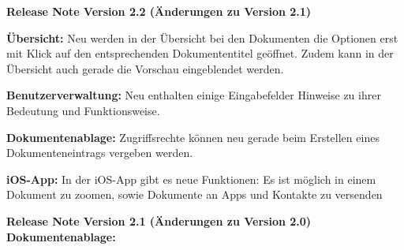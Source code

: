 \vspace{\baselineskip}

\textbf{Release Note Version 2.2 (Änderungen zu Version 2.1)} \\

\begin{compactitem}
	\item \textbf{Übersicht:} Neu werden in der Übersicht bei den Dokumenten die Optionen erst mit Klick auf den entsprechenden Dokumententitel geöffnet. Zudem kann in der Übersicht auch gerade die Vorschau eingeblendet werden. 
	\item \textbf{Benutzerverwaltung:} Neu enthalten einige Eingabefelder Hinweise zu ihrer Bedeutung und Funktionsweise.
	\item \textbf{Dokumentenablage:} Zugriffsrechte können neu gerade beim Erstellen eines Dokumenteneintrags vergeben werden.
	\item \textbf{iOS-App:} In der iOS-App gibt es neue Funktionen: Es ist möglich in einem Dokument zu zoomen, sowie Dokumente an Apps und Kontakte zu versenden
\end{compactitem}

\vspace{\baselineskip}

\textbf{Release Note Version 2.1 (Änderungen zu Version 2.0)} \\

\textbf{Dokumentenablage:}

